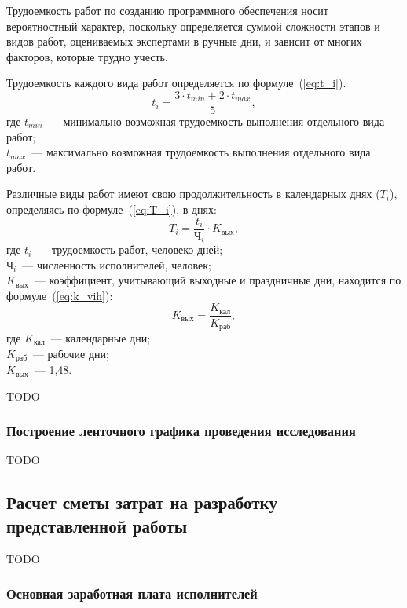 \documentclass{mirea}
\begin{document}
Трудоемкость работ по созданию программного обеспечения носит вероятностный характер, поскольку определяется суммой сложности этапов и видов работ, оцениваемых экспертами в ручные дни, и зависит от многих факторов, которые трудно учесть.

Трудоемкость каждого вида работ определяется по формуле~(\ref{eq:t_i}).
\begin{equation}\label{eq:t_i}
	t_i=\frac{3 \cdot t_{min} + 2 \cdot t_{max}}{5},
\end{equation}
где $t_{min}$~--- минимально возможная трудоемкость выполнения отдельного вида работ; \\
$t_{max}$~--- максимально возможная трудоемкость выполнения отдельного вида
работ.

Различные виды работ имеют свою продолжительность в календарных днях ($T_{i}$), определяясь по формуле~(\ref{eq:T_i}), в днях:
\begin{equation}\label{eq:T_i}
	T_i=\frac{t_{i}}{\text{Ч}_{i}} \cdot K_{\text{вых}},
\end{equation}
где $t_{i}$~--- трудоемкость работ, человеко-дней; \\
$\text{Ч}_{i}$~--- численность исполнителей, человек; \\
$K_{\text{вых}}$~--- коэффициент, учитывающий выходные и праздничные дни, находится по формуле~(\ref{eq:k_vih}):
\begin{equation}\label{eq:k_vih}
	K_{\text{вых}}=\frac{K_{\text{кал}}}{K_{\text{раб}}},
\end{equation}
где $K_{\text{кал}}$~--- календарные дни; \\
$K_{\text{раб}}$~--- рабочие дни; \\
$K_{\text{вых}}$~--- 1,48.

TODO

\subsubsection{Построение ленточного графика проведения исследования}

TODO

\subsection{Расчет сметы затрат на разработку представленной работы}

TODO

\subsubsection{Основная заработная плата исполнителей}
\end{document}
